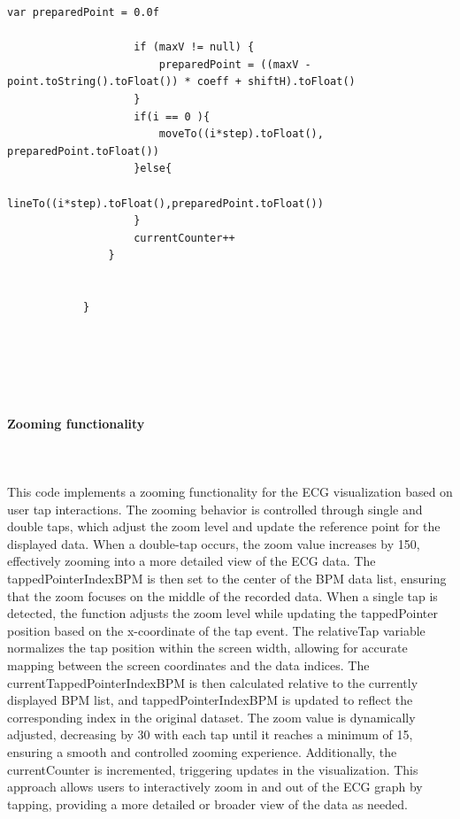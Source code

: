 {{\begin{lstlisting}[label={fig:simpleSourceGen.cs}, caption={Code to draw the recorded ECG-Data}]
					var preparedPoint = 0.0f
					
					if (maxV != null) {
						preparedPoint = ((maxV - point.toString().toFloat()) * coeff + shiftH).toFloat()
					}
					if(i == 0 ){
						moveTo((i*step).toFloat(), preparedPoint.toFloat())
					}else{
						lineTo((i*step).toFloat(),preparedPoint.toFloat())
					}
					currentCounter++
				}
				
				
			}
			
		\end{lstlisting}
		\mbox{}\\
		\mbox{}\\
		\mbox{}\\
	\paragraph{Zooming functionality}\mbox{}\\
	\mbox{}\\
	This code implements a zooming functionality for the ECG visualization based on user tap interactions. The zooming behavior is controlled through single and double taps, which adjust the zoom level and update the reference point for the displayed data.
	When a double-tap occurs, the zoom value increases by 150, effectively zooming into a more detailed view of the ECG data. The tappedPointerIndexBPM is then set to the center of the BPM data list, ensuring that the zoom focuses on the middle of the recorded data.
	When a single tap is detected, the function adjusts the zoom level while updating the tappedPointer position based on the x-coordinate of the tap event. The relativeTap variable normalizes the tap position within the screen width, allowing for accurate mapping between the screen coordinates and the data indices. The currentTappedPointerIndexBPM is then calculated relative to the currently displayed BPM list, and tappedPointerIndexBPM is updated to reflect the corresponding index in the original dataset.
	The zoom value is dynamically adjusted, decreasing by 30 with each tap until it reaches a minimum of 15, ensuring a smooth and controlled zooming experience. Additionally, the currentCounter is incremented, triggering updates in the visualization. This approach allows users to interactively zoom in and out of the ECG graph by tapping, providing a more detailed or broader view of the data as needed.
	
	\mbox{}\\
	\mbox{}\\
	\mbox{}\\
	\mbox{}\\
	\mbox{}\\
	\mbox{}\\
	\mbox{}\\
	\mbox{}\\
	\mbox{}\\
	\mbox{}\\
	
}}
